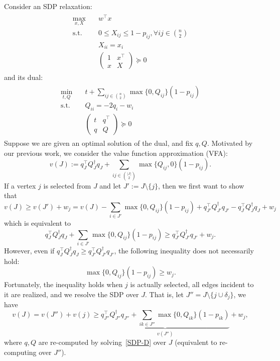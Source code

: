 \documentclass[10pt,leqno]{amsart}
\begin{document}
Consider an SDP relaxation:
\begin{align}
  \label{SDP-P}
  \tag{SDP-P}
  \begin{split}
    \max_{x,X}\quad &w^\top x\\
    \text{s.t.}\quad &0\leq X_{ij}\leq 1-p_{ij},\forall ij\in{n\choose{2}}\\
    &X_{ii}=x_i\\
    &
    \begin{pmatrix}
      1&x^\top\\
      x&X
    \end{pmatrix}\succeq 0
  \end{split}
\end{align}
and its dual:
\begin{align}
  \label{SDP-D}
  \tag{SDP-D}
  \begin{split}
    \min_{t,Q}\quad &t+\sum_{ij\in{n\choose{2}}}\max\{0,Q_{ij}\}(1-p_{ij})\\
    \text{s.t.}\quad &
    Q_{ii}=-2q_i-w_i\\
    &
    \begin{pmatrix}
      t&q^\top\\
      q&Q
    \end{pmatrix}\succeq 0
  \end{split}
\end{align}
Suppose we are given an optimal solution of the dual, and fix $q,Q$.
Motivated by our previous work, we consider the value function approximation (VFA):
\[v(J):=q_{J}^\top Q^\dagger_{J}q_{J}+\sum_{ij\in{|J|\choose{2}}}\max\{Q_{ij},0\}(1-p_{ij}).\]
If a vertex $j$ is selected from $J$ and let $J':=J\setminus\{j\}$, then we first want to show that
\[v(J)\geq v(J')+w_j=v(J)-\sum_{i\in J'}\max\{0,Q_{ij}\}(1-p_{ij})+q_{J'}^\top Q_{J'}^\dagger q_{J'}-q_J^\top Q_J^\dagger q_J+w_j\]
which is equivalent to
\[q_J^\top Q_J^\dagger q_J+\sum_{i\in J'}\max\{0,Q_{ij}\}(1-p_{ij})\geq q_{J'}^\top Q_{J'}^\dagger q_{J'}+w_j.\]
However, even if $q_J^\top Q_J^\dagger q_J\geq q_{J'}^\top Q_{J'}^\dagger q_{J'}$, the following inequality does not necessarily hold:
\[\max\{0,Q_{ij}\}(1-p_{ij})\geq w_j.\]
Fortunately, the inequality holds when $j$ is actually selected, all edges incident to it are realized, and we resolve the SDP over $J$.
That is, let $J''=J\setminus\{j\cup\delta_j\}$, we have
\[v(J)= v(J'')+v(j)\geq \underbrace{q_{J''}^\top Q_{J''}^\dagger q_{J''}+\sum_{ik\in J''}\max\{0,Q_{ik}\}(1-p_{ik})}_{v(J'')}+w_j,\]
where $q,Q$ are re-computed by solving~\eqref{SDP-D} over $J$ (equivalent to re-computing over $J''$).
\end{document}
